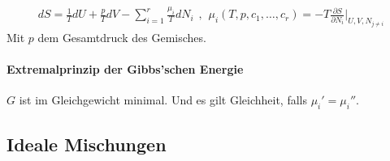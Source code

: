 \begin{align*}
    dS = \frac{1}{T} d U + \frac{p}{T} dV - \sum_{i=1}^r \frac{\mu_i}{T} d N_i
    \hspace{5pt} , \hspace{5pt}
    \mu_i(T,p,c_1,\dots,c_r) = - T \frac{\partial S}{\partial N_i} \Big|_{U,V,N_{j \neq i}}
\end{align*}
Mit $p$ dem Gesamtdruck des Gemisches.

\paragraph{Extremalprinzip der Gibbs'schen Energie}
$G$ ist im Gleichgewicht minimal. Und es gilt Gleichheit, falls
$\mu_i' = \mu_i''$.


\vspace{-3pt}

\subsection{Ideale Mischungen}

